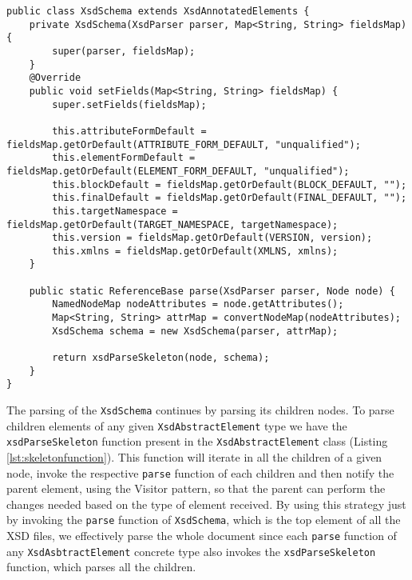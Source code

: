 \begin{minipage}{\linewidth}
\begin{lstlisting}[caption={XsdSchema Information Extraction (Simplified)},captionpos=b,label={lst:xsdschemaparsing}]
public class XsdSchema extends XsdAnnotatedElements {
    private XsdSchema(XsdParser parser, Map<String, String> fieldsMap){
        super(parser, fieldsMap);
    }
    @Override
    public void setFields(Map<String, String> fieldsMap) {
        super.setFields(fieldsMap);

        this.attributeFormDefault = fieldsMap.getOrDefault(ATTRIBUTE_FORM_DEFAULT, "unqualified");
        this.elementFormDefault = fieldsMap.getOrDefault(ELEMENT_FORM_DEFAULT, "unqualified");
        this.blockDefault = fieldsMap.getOrDefault(BLOCK_DEFAULT, "");
        this.finalDefault = fieldsMap.getOrDefault(FINAL_DEFAULT, "");
        this.targetNamespace = fieldsMap.getOrDefault(TARGET_NAMESPACE, targetNamespace);
        this.version = fieldsMap.getOrDefault(VERSION, version);
        this.xmlns = fieldsMap.getOrDefault(XMLNS, xmlns);
    }
    
    public static ReferenceBase parse(XsdParser parser, Node node) {
        NamedNodeMap nodeAttributes = node.getAttributes();
        Map<String, String> attrMap = convertNodeMap(nodeAttributes);        
        XsdSchema schema = new XsdSchema(parser, attrMap);    
    
        return xsdParseSkeleton(node, schema);
    }
}
\end{lstlisting}
\end{minipage}

\noindent
The parsing of the \texttt{XsdSchema} continues by parsing its children nodes. To parse children elements of any given \texttt{XsdAbstractElement} type we have the \texttt{xsdParseSkeleton} function present in the \texttt{XsdAbstractElement} class (Listing \ref{lst:skeletonfunction}). This function will iterate in all the children of a given node, invoke the respective \texttt{parse} function of each children and then notify the parent element, using the Visitor pattern, so that the parent can perform the changes needed based on the type of element received. By using this strategy just by invoking the \texttt{parse} function of \texttt{XsdSchema}, which is the top element of all the \ac{XSD} files, we effectively parse the whole document since each \texttt{parse} function of any \texttt{XsdAsbtractElement} concrete type also invokes the \texttt{xsdParseSkeleton} function, which parses all the children.

